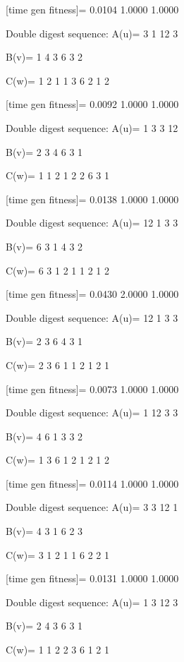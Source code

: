 [time gen fitness]=
    0.0104    1.0000    1.0000

Double digest sequence:
A(u)=
     3     1    12     3

B(v)=
     1     4     3     6     3     2

C(w)=
     1     2     1     1     3     6     2     1     2

[time gen fitness]=
    0.0092    1.0000    1.0000

Double digest sequence:
A(u)=
     1     3     3    12

B(v)=
     2     3     4     6     3     1

C(w)=
     1     1     2     1     2     2     6     3     1

[time gen fitness]=
    0.0138    1.0000    1.0000

Double digest sequence:
A(u)=
    12     1     3     3

B(v)=
     6     3     1     4     3     2

C(w)=
     6     3     1     2     1     1     2     1     2

[time gen fitness]=
    0.0430    2.0000    1.0000

Double digest sequence:
A(u)=
    12     1     3     3

B(v)=
     2     3     6     4     3     1

C(w)=
     2     3     6     1     1     2     1     2     1

[time gen fitness]=
    0.0073    1.0000    1.0000

Double digest sequence:
A(u)=
     1    12     3     3

B(v)=
     4     6     1     3     3     2

C(w)=
     1     3     6     1     2     1     2     1     2

[time gen fitness]=
    0.0114    1.0000    1.0000

Double digest sequence:
A(u)=
     3     3    12     1

B(v)=
     4     3     1     6     2     3

C(w)=
     3     1     2     1     1     6     2     2     1

[time gen fitness]=
    0.0131    1.0000    1.0000

Double digest sequence:
A(u)=
     1     3    12     3

B(v)=
     2     4     3     6     3     1

C(w)=
     1     1     2     2     3     6     1     2     1

